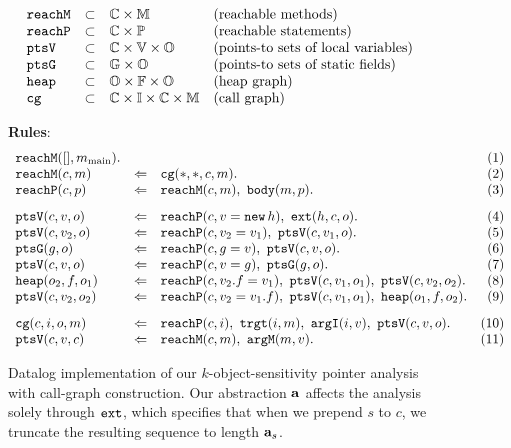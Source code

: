 \begin{figure*}
\begin{minipage}{3.7in}
\[ \begin{array}{lcll}
\text{\tt reachM}   &\subset& {\mathbb C} \times {\mathbb M} & \text{(reachable methods)} \\
\text{\tt reachP}   &\subset& {\mathbb C} \times {\mathbb P} & \text{(reachable statements)} \\
\text{\tt ptsV}     &\subset& {\mathbb C} \times {\mathbb V} \times {\mathbb O} & \text{(points-to sets of local variables)} \\
\text{\tt ptsG}     &\subset& {\mathbb G} \times {\mathbb O} & \text{(points-to sets of static fields)} \\
\text{\tt heap}     &\subset& {\mathbb O} \times {\mathbb F} \times {\mathbb O} & \text{(heap graph)} \\
\text{\tt cg}       &\subset& {\mathbb C} \times {\mathbb I} \times {\mathbb C} \times {\mathbb M} & \text{(call graph)}
\end{array}
\]
\end{minipage}
{\bf Rules}: \\
\[
\begin{array}{lclr}
\reachM([],\mmain). &           &  & (1) \\
\reachM(c,m)              &\dlogUpdate& \cg(*,*,c,m). & (2) \\
\reachP(c,p)              &\dlogUpdate& \reachM(c,m),\ \body(m,p). & (3)
\\[8pt]
\ptsV(c,v,o)              &\dlogUpdate& \reachP(c, v = \new\,h),\ \ext(h, c, o). & (4) \\
\ptsV(c,v_2,o)            &\dlogUpdate& \reachP(c, v_2 = v_1),\ \ptsV(c,v_1,o). & (5) \\
\ptsG(g,o)                &\dlogUpdate& \reachP(c, g = v),\ \ptsV(c,v,o). & (6) \\
\ptsV(c,v,o)              &\dlogUpdate& \reachP(c, v = g),\ \ptsG(g,o). & (7) \\
\heap(o_2,f,o_1)          &\dlogUpdate& \reachP(c, v_2.f = v_1),\ \ptsV(c,v_1,o_1),\ \ptsV(c,v_2,o_2). & (8) \\
\ptsV(c,v_2,o_2)          &\dlogUpdate& \reachP(c, v_2 = v_1.f),\ \ptsV(c,v_1,o_1),\ \heap(o_1,f,o_2). & (9)
\\[8pt]
\cg(c,i,o,m)            &\dlogUpdate& \reachP(c,i),\ \trgt(i,m),\ \argI(i,v),\ \ptsV(c,v,o). & (10) \\
\ptsV(c,v,c)             &\dlogUpdate& \reachM(c,m),\ \argM(m,v). & (11)
\end{array}
\]
\caption{Datalog implementation of our $k$-object-sensitivity pointer analysis with call-graph construction.
Our abstraction $\mathbf{a}$ affects the analysis solely through $\text{\tt ext}$,
which specifies that when we prepend $s$ to $c$, we truncate the resulting sequence to length $\mathbf{a}_{s}$.
}
\label{fig:aliasAnalysisRules}
\end{figure*}

